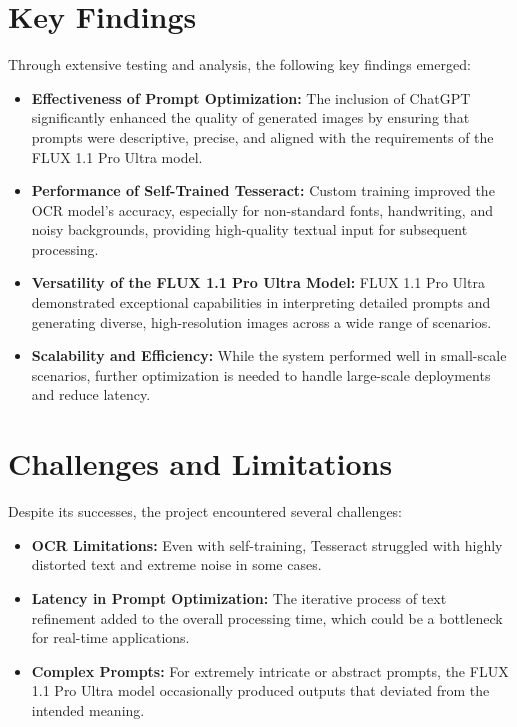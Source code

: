 \section{Key Findings}
Through extensive testing and analysis, the following key findings emerged:
\begin{itemize}
    \item \textbf{Effectiveness of Prompt Optimization:} The inclusion of ChatGPT significantly enhanced the quality of generated images by ensuring that prompts were descriptive, precise, and aligned with the requirements of the FLUX 1.1 Pro Ultra model.
    \item \textbf{Performance of Self-Trained Tesseract:} Custom training improved the OCR model's accuracy, especially for non-standard fonts, handwriting, and noisy backgrounds, providing high-quality textual input for subsequent processing.
    \item \textbf{Versatility of the FLUX 1.1 Pro Ultra Model:} FLUX 1.1 Pro Ultra demonstrated exceptional capabilities in interpreting detailed prompts and generating diverse, high-resolution images across a wide range of scenarios.
    \item \textbf{Scalability and Efficiency:} While the system performed well in small-scale scenarios, further optimization is needed to handle large-scale deployments and reduce latency.
\end{itemize}

\section{Challenges and Limitations}
Despite its successes, the project encountered several challenges:
\begin{itemize}
    \item \textbf{OCR Limitations:} Even with self-training, Tesseract struggled with highly distorted text and extreme noise in some cases.
    \item \textbf{Latency in Prompt Optimization:} The iterative process of text refinement added to the overall processing time, which could be a bottleneck for real-time applications.
    \item \textbf{Complex Prompts:} For extremely intricate or abstract prompts, the FLUX 1.1 Pro Ultra model occasionally produced outputs that deviated from the intended meaning.
\end{itemize}

